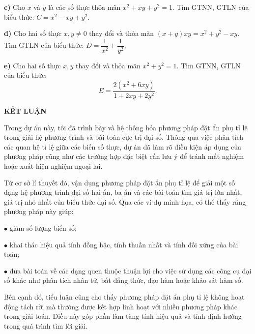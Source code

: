 \documentclass[12pt]{report}
\begin{document}
\noindent \textbf{c)} Cho $x$ và $y$ là các số thực thỏa mãn $x^2 + xy + y^2 = 1$. Tìm GTNN, GTLN của biểu thức: $C = x^2 - xy + y^2$.

\vspace{0.3cm}
\noindent \textbf{d)} Cho hai số thực $x, y \neq 0$ thay đổi và thỏa mãn $(x + y)xy = x^2 + y^2 - xy$. Tìm GTLN của biểu thức: $D = \dfrac{1}{x^2} + \dfrac{1}{y^2}$.

\vspace{0.3cm}
\noindent \textbf{e)} Cho hai số thực $x, y$ thay đổi và thỏa mãn $x^2 + y^2 = 1$. Tìm GTNN, GTLN của biểu thức:
\[
E = \dfrac{2(x^2 + 6xy)}{1 + 2xy + 2y^2}.
\]
\newpage
\begin{center}
    \textbf{\Large KẾT LUẬN}
\end{center}

\vspace{0.5cm}
\noindent Trong dự án này, tôi đã trình bày và hệ thống hóa phương pháp đặt ẩn phụ tỉ lệ trong giải hệ phương trình và bài toán cực trị đại số. Thông qua việc phân tích các quan hệ tỉ lệ giữa các biến số thực, dự án đã làm rõ điều kiện áp dụng của phương pháp cũng như các trường hợp đặc biệt cần lưu ý để tránh mất nghiệm hoặc xuất hiện nghiệm ngoại lai.

\vspace{0.3cm}
\noindent Từ cơ sở lí thuyết đó, vận dụng phương pháp đặt ẩn phụ tỉ lệ để giải một số dạng hệ phương trình đại số hai ẩn, ba ẩn và các bài toán tìm giá trị lớn nhất, giá trị nhỏ nhất của biểu thức đại số. Qua các ví dụ minh họa, có thể thấy rằng phương pháp này giúp:

\vspace{0.2cm}
\noindent $\bullet$ giảm số lượng biến số;

\vspace{0.1cm}
\noindent $\bullet$ khai thác hiệu quả tính đồng bậc, tính thuần nhất và tính đối xứng của bài toán;

\vspace{0.1cm}
\noindent $\bullet$ đưa bài toán về các dạng quen thuộc thuận lợi cho việc sử dụng các công cụ đại số khác như phân tích nhân tử, bất đẳng thức, đạo hàm hoặc khảo sát hàm số.

\vspace{0.3cm}
\noindent Bên cạnh đó, tiểu luận cũng cho thấy phương pháp đặt ẩn phụ tỉ lệ không hoạt động tách rời mà thường được kết hợp linh hoạt với nhiều phương pháp khác trong giải toán. Điều này góp phần làm tăng tính hiệu quả và tính định hướng trong quá trình tìm lời giải.
\end{document}
